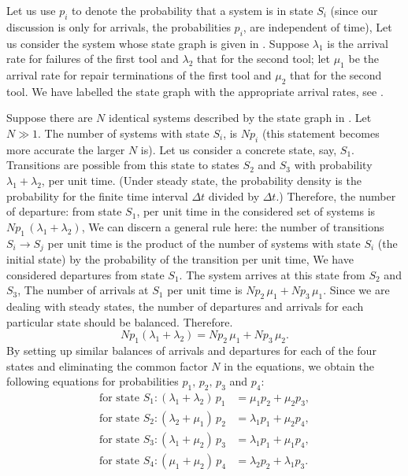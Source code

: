  Let us
use $p_{i}$ to denote the probability that a system is in state
$S_{i}$ (since our discussion is only for 
arrivals, the probabilities $p_{i}$, are independent of time), Let us
consider the system whose state graph is given in . Suppose $\lambda_{1}$ is the arrival rate for failures of the first tool and $\lambda_{2}$ that for the second tool; let $\mu_{1}$ be the arrival rate for repair terminations of the first tool and $\mu_{2}$ that for the second tool. We have labelled the state graph with the appropriate arrival rates, see .



 Suppose there are $N$ identical systems described by the state graph
 in . Let $N \gg 1$. The number of systems with
 state $S_{i}$, is $N p_{i}$ (this statement becomes more accurate the
 larger $N$ is). Let us consider a concrete state, say,
 $S_{1}$. Transitions are possible from this state to states $S_{2}$
and $S_{3}$ with probability $\lambda_{1} + \lambda_{2}$, per unit
time. (Under steady state, the probability density is the probability
for the ﬁnite time interval $\Delta t$ divided by $\Delta t$.)
Therefore, the number of departure: from state $S_{1}$, per unit time in
the considered set of systems is $N p_{ 1}\, (\lambda_{1}+\lambda_{2})$,
We can discern a general rule here: the number of transitions
$S_{i} \to S_{j}$ per unit time is the product of the number of
systems with state $S_{i}$ (the initial state) by the probability of
the transition per unit time, We have considered departures from state
$S_{1}$. The system arrives at this state from $S_{2}$ and $S_{3}$, The number
of arrivals at $S_{1}$ per unit time is $N p_{2} \, \mu_{1} + N p_{3}
\, \mu_{1}$. Since we are dealing
with steady states, the number of departures and arrivals for each
particular state should be balanced.  Therefore.  
\begin{equation*}%
N p_{ 1}(\lambda_{1}+\lambda_{2}) = N p_{2} \, \mu_{1} + N p_{3} \, \mu_{2}.
\end{equation*}
By setting up similar balances of arrivals and departures for each of
the four states and eliminating the common factor $N$ in the equations, we obtain the following equations for probabilities $p_{1}, \, p_{2},
\, p_{3}$ and $p_{4}$:
\begin{align*}%
\text{for state} \,\,  S_{1}: (\lambda_{1} + \lambda_{2}) \, p_{1} &
= \mu_{1} p_{2} + \mu_{2} p_{3}, \\
\text{for state} \,\,  S_{2}: (\lambda_{2} + \mu_{1}) \, p_{2} &
= \lambda_{1} p_{1} + \mu_{2} p_{4}, \\
\text{for state} \,\,  S_{3}: (\lambda_{1} + \mu_{2}) \, p_{3} &
= \lambda_{1} p_{1} + \mu_{1} p_{4}, \\
\text{for state} \,\,  S_{4}: (\mu_{1} + \mu_{2}) \, p_{4} &
= \lambda_{2} p_{2} + \lambda_{1} p_{3}. 
\end{align*}
